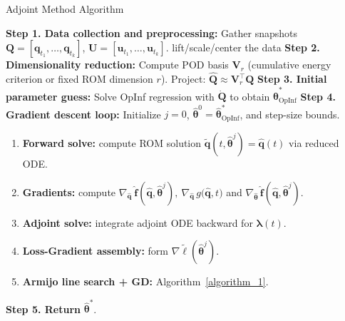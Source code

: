 \begin{frame}{Adjoint Method Algorithm}
    
\begin{center}
\begin{minipage}{0.97\textwidth}
\scriptsize
\LinesNotNumbered
\begin{algorithm}[H]
\caption{Adjoint Method for Parameter Training}\label{algorithm_2}
\SetAlgoNoLine
\textbf{Step 1. Data collection and preprocessing:} Gather snapshots $\mathbf{Q}=[\mathbf{q}_{t_1},\dots,\mathbf{q}_{t_k}]$, $\mathbf{U}=[\mathbf{u}_{t_1},\dots,\mathbf{u}_{t_k}]$.
\quad [Optional] lift/scale/center the data\;
\textbf{Step 2. Dimensionality reduction:} Compute POD basis $\mathbf{V}_r$ (cumulative energy criterion or fixed ROM dimension $r$). Project: $\hat{\mathbf{Q}} \approx \mathbf{V}_r^\top\mathbf{Q}$\;
\textbf{Step 3. Initial parameter guess:} Solve OpInf regression with $\dot{\mathbf{Q}}$ to obtain $\hat{\bm\theta}^{*}_{\text{OpInf}}$\;
\textbf{Step 4. Gradient descent loop:}
Initialize $j=0$, $\hat{\bm\theta}^0=\hat{\bm\theta}^{*}_{\text{OpInf}}$, and step-size bounds.
\begin{enumerate}
  \item \textbf{Forward solve:}
    compute ROM solution $\tilde{\mathbf{q}}(t,\hat{\bm\theta}^j) = \hat{\mathbf{q}}(t)$ via reduced ODE.
  \item \textbf{Gradients:}
    compute $\nabla_{\hat{\mathbf{q}}}~\hat{\mathbf{f}}(\hat{\mathbf{q}}, \hat{\bm{\theta}}^j),~\nabla_{\hat{\mathbf{q}}}\,g\bigl(\hat{\mathbf{q}},t\bigr)$ and $\nabla_{\hat{\bm{\theta}}}\,\hat{\mathbf{f}}(\hat{\mathbf{q}}, \hat{\bm{\theta}}^j)$.
  \item \textbf{Adjoint solve:}
    integrate adjoint ODE backward for $\bm\lambda(t)$.
  \item \textbf{Loss-Gradient assembly:}
    form $\nabla\tilde\ell(\hat{\bm\theta}^j)$.
  \item \textbf{Armijo line search + GD:} Algorithm~\ref{algorithm_1}.
\end{enumerate}
\textbf{Step 5. Return} {$\hat{\bm\theta}^*$}.
\end{algorithm}
\end{minipage}
\end{center}

\end{frame}